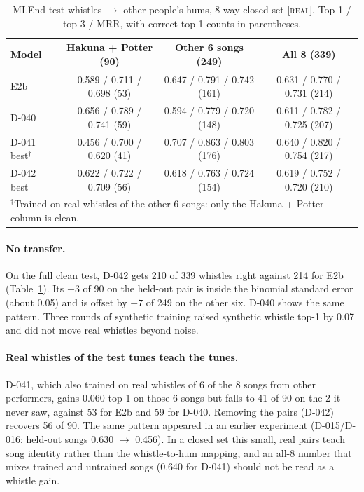 \documentclass[11pt]{article}
\newcommand{\real}{\textsc{[real]}}
\begin{document}
\begin{table}[t]
\centering
\caption{MLEnd test whistles $\to$ other people's hums, 8-way closed set \real. Top-1 / top-3 / MRR, with correct top-1 counts in parentheses.}
\label{tab:mlend}
\small
\setlength{\tabcolsep}{4pt}
\begin{tabular}{lccc}
\toprule
Model & Hakuna + Potter (90) & Other 6 songs (249) & All 8 (339) \\
\midrule
E2b & 0.589 / 0.711 / 0.698 (53) & 0.647 / 0.791 / 0.742 (161) & 0.631 / 0.770 / 0.731 (214) \\
D-040 & 0.656 / 0.789 / 0.741 (59) & 0.594 / 0.779 / 0.720 (148) & 0.611 / 0.782 / 0.725 (207) \\
D-041 best$^\dagger$ & 0.456 / 0.700 / 0.620 (41) & 0.707 / 0.863 / 0.803 (176) & 0.640 / 0.820 / 0.754 (217) \\
D-042 best & 0.622 / 0.722 / 0.709 (56) & 0.618 / 0.763 / 0.724 (154) & 0.619 / 0.752 / 0.720 (210) \\
\bottomrule
\multicolumn{4}{l}{\footnotesize $^\dagger$Trained on real whistles of the other 6 songs: only the Hakuna + Potter column is clean.}
\end{tabular}
\end{table}

\paragraph{No transfer.} On the full clean test, D-042 gets 210 of 339 whistles right against 214 for E2b (Table~\ref{tab:mlend}). Its $+3$ of 90 on the held-out pair is inside the binomial standard error (about 0.05) and is offset by $-7$ of 249 on the other six. D-040 shows the same pattern. Three rounds of synthetic training raised synthetic whistle top-1 by 0.07 and did not move real whistles beyond noise.

\paragraph{Real whistles of the test tunes teach the tunes.} D-041, which also trained on real whistles of 6 of the 8 songs from other performers, gains 0.060 top-1 on those 6 songs but falls to 41 of 90 on the 2 it never saw, against 53 for E2b and 59 for D-040. Removing the pairs (D-042) recovers 56 of 90. The same pattern appeared in an earlier experiment (D-015/D-016: held-out songs 0.630 $\to$ 0.456). In a closed set this small, real pairs teach song identity rather than the whistle-to-hum mapping, and an all-8 number that mixes trained and untrained songs (0.640 for D-041) should not be read as a whistle gain.
\end{document}
